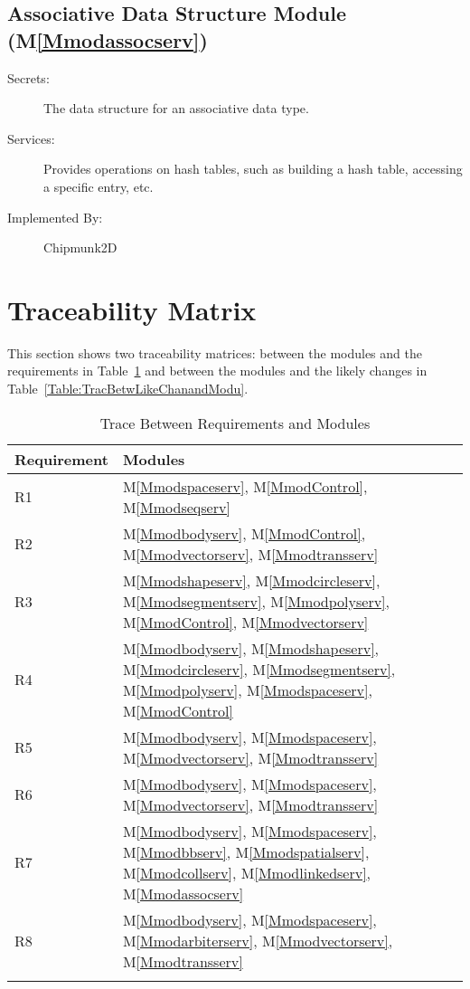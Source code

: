 \documentclass[12pt]{article}
\begin{document}
\subsection{Associative Data Structure Module (M\ref{Mmodassocserv})}
\label{Sec:AssoDataStruModu()}
\begin{description}
\item[Secrets:]The data structure for an associative data type.
\item[Services:]Provides operations on hash tables, such as building a hash table, accessing a specific entry, etc.
\item[Implemented By:]Chipmunk2D
\end{description}
\section{Traceability Matrix}
\label{Sec:TracMatr}
This section shows two traceability matrices: between the modules and the requirements in Table~\ref{Table:TracBetwRequandModu} and between the modules and the likely changes in Table~\ref{Table:TracBetwLikeChanandModu}.
\begin{longtable}{l l}
\toprule
Requirement & Modules
\\
\midrule
R1 & M\ref{Mmodspaceserv}, M\ref{MmodControl}, M\ref{Mmodseqserv}
\\
R2 & M\ref{Mmodbodyserv}, M\ref{MmodControl}, M\ref{Mmodvectorserv}, M\ref{Mmodtransserv}
\\
R3 & M\ref{Mmodshapeserv}, M\ref{Mmodcircleserv}, M\ref{Mmodsegmentserv}, M\ref{Mmodpolyserv}, M\ref{MmodControl}, M\ref{Mmodvectorserv}
\\
R4 & M\ref{Mmodbodyserv}, M\ref{Mmodshapeserv}, M\ref{Mmodcircleserv}, M\ref{Mmodsegmentserv}, M\ref{Mmodpolyserv}, M\ref{Mmodspaceserv}, M\ref{MmodControl}
\\
R5 & M\ref{Mmodbodyserv}, M\ref{Mmodspaceserv}, M\ref{Mmodvectorserv}, M\ref{Mmodtransserv}
\\
R6 & M\ref{Mmodbodyserv}, M\ref{Mmodspaceserv}, M\ref{Mmodvectorserv}, M\ref{Mmodtransserv}
\\
R7 & M\ref{Mmodbodyserv}, M\ref{Mmodspaceserv}, M\ref{Mmodbbserv}, M\ref{Mmodspatialserv}, M\ref{Mmodcollserv}, M\ref{Mmodlinkedserv}, M\ref{Mmodassocserv}
\\
R8 & M\ref{Mmodbodyserv}, M\ref{Mmodspaceserv}, M\ref{Mmodarbiterserv}, M\ref{Mmodvectorserv}, M\ref{Mmodtransserv}
\\
\bottomrule
\caption{Trace Between Requirements and Modules}
\label{Table:TracBetwRequandModu}
\end{longtable}
\end{document}
